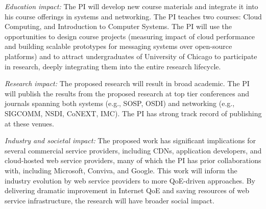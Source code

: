 \begin{packeditemize}


\item {\em Education impact:}
The PI will develop new course materials and integrate it into his course offerings in systems and networking. 
The PI teaches two courses: Cloud Computing, and Introduction to Computer Systems. The PI will use the opportunities to design course projects (\eg measuring impact of cloud performance and building scalable prototypes for messaging systems over open-source platforms) and to attract undergraduates of University of Chicago to participate in research, deeply integrating them into the entire research lifecycle.


\item {\em Research impact:}
The proposed research will result in broad academic.
The PI will publish the results from the proposed research at top tier conferences and journals spanning both systems (e.g., SOSP, OSDI) and networking (e.g., SIGCOMM, NSDI, CoNEXT, IMC).
The PI has strong track record of publishing at these venues.


\item {\em Industry and societal impact:}
The proposed work has significant implications for several commercial service providers, including CDNs, application developers, and cloud-hosted web service providers, many of which the PI has prior collaborations with, including Microsoft, Conviva, and Google. 
This work will inform the industry evolution by web service providers to more QoE-driven approaches.
By delivering dramatic improvement in Internet QoE and saving resources of web service infrastructure, the research will have broader social impact. 


\end{packeditemize}
